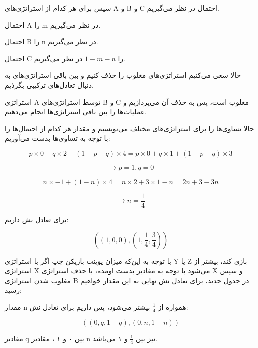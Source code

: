 سپس برای هر کدام از استراتژی‌های A و B و C احتمال در نظر می‌گیریم.

احتمال A را m در نظر می‌گیریم.

احتمال B را n در نظر می‌گیریم.

احتمال C را 
$1 - m - n$
در نظر می‌گیریم.

حالا سعی می‌کنیم استراتژی‌های مغلوب را حذف کنیم و بین باقی استراتژی‌های به دنبال تعادل‌های ترکیبی بگرذیم.

استراتژی A توسط استراتژی‌های B و C مغلوب است، پس به حذف آن می‌پردازیم و عملیات‌ها را بین باقی استراتژی‌ها انجام می‌دهیم.

حالا تساوی‌ها را برای استراتژی‌های مختلف می‌نویسیم و مقدار هر کدام از احتمال‌ها را با توجه به تساوی‌ها بدست می‌آوریم:

$$
p \times 0 + q \times 2 + (1 - p - q) \times 4 = p \times 0 + q \times 1 + (1 - p - q) \times 3
$$

$$
\rightarrow p = 1 , q = 0
$$

$$
n \times -1 + (1 - n) \times 4 = n \times 2 + 3 \times 1 - n = 2n + 3 - 3n
$$

$$
\rightarrow n = \frac{1}{4}
$$

برای تعادل نش داریم:

$$
( (1, 0, 0) , (1, \frac{1}{4} , \frac{3}{4}))
$$

با توجه به این‌که میزان پوینت بازیکن چپ اگر با استراتژی Y یا Z بازی کند، بیشتر از استراتژی X می‌شود با توجه به مقادیز بدست اومده، با حذف استراتژی X و سپس مغلوب شدن استراتژی B در جدول جدید، برای تعادل نش نهایی به این مقدار خواهیم رسید:

مقدار n همواره از 
$\frac{1}{4}$
بیشتر می‌شود،
پس داریم برای تعادل نش:

$$
((0 , q, 1 - q) , (0 , n , 1 - n))
$$

مقادیر q بین ۰ و ۱ ، مقادیر n نیز بین 
$\frac{1}{4}$
و ۱ می‌باشد.


